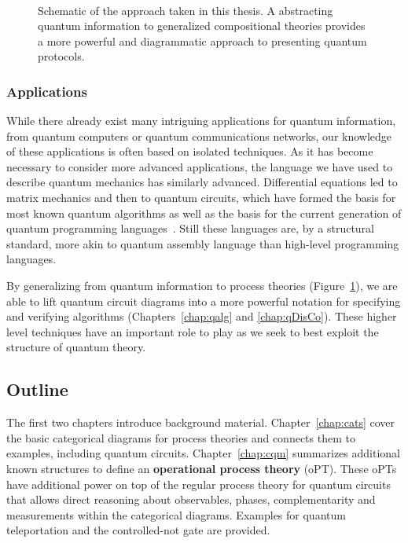 \begin{figure}[t]
\begin{align*}

\end{align*}
\caption[Schematic of generalized compositional theories and categorical diagrams.]{Schematic of the approach taken in this thesis. A abstracting quantum information to generalized compositional theories provides a more powerful and diagrammatic approach to presenting quantum protocols.}
\label{fig:overview}
\end{figure}


\subsubsection*{Applications} While there already exist many intriguing applications for quantum information, from quantum computers or quantum communications networks, our knowledge of these applications is often based on isolated techniques. As it has become necessary to consider more advanced applications, the language we have used to describe quantum mechanics has similarly advanced. Differential equations led to matrix mechanics and then to quantum circuits, which have formed the basis for most known quantum algorithms as well as the basis for the current generation of quantum programming languages~\cite{green2013quipper,wecker2014liqui}. Still these languages are, by a structural standard, more akin to quantum assembly language than high-level programming languages. 

By generalizing from quantum information to process theories (Figure~\ref{fig:overview}), we are able to lift quantum circuit diagrams into a more powerful notation for specifying and verifying algorithms (Chapters~\ref{chap:qalg} and \ref{chap:qDisCo}). These higher level techniques have an important role to play as we seek to best exploit the structure of quantum theory. 

\subsection*{Outline}

The first two chapters introduce background material. Chapter~\ref{chap:cats} cover the basic categorical diagrams for process theories and connects them to examples, including quantum circuits. Chapter~\ref{chap:cqm} summarizes additional known structures to define an \textbf{operational process theory} (oPT). These oPTs have additional power on top of the regular process theory for quantum circuits that allows direct reasoning about observables, phases, complementarity and measurements within the categorical diagrams. Examples for quantum teleportation and the controlled-not gate are provided.

